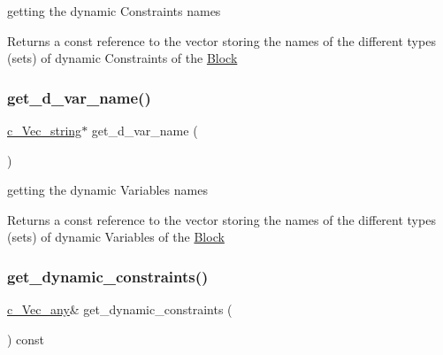 getting the dynamic Constraints\textquotesingle{} names 

Returns a const reference to the vector storing the names of the different types (sets) of dynamic Constraints of the \mbox{\hyperlink{class_s_m_spp__di__unipi__it_1_1_block}{Block}} \mbox{\label{class_s_m_spp__di__unipi__it_1_1_block_af2bfcc91820dd84530bc0677a0a498ee}} 
\subsubsection{\texorpdfstring{get\+\_\+d\+\_\+var\+\_\+name()}{get\_d\_var\_name()}}
{\footnotesize\ttfamily \mbox{\hyperlink{group___s_m_s__types_ga4eb8b5e087882b48fc77ba2a18267301}{c\+\_\+\+Vec\+\_\+string}}$\ast$ get\+\_\+d\+\_\+var\+\_\+name (\begin{DoxyParamCaption}\item[{void}]{ }\end{DoxyParamCaption})\hspace{0.3cm}{\ttfamily [inline]}}



getting the dynamic Variables\textquotesingle{} names 

Returns a const reference to the vector storing the names of the different types (sets) of dynamic Variables of the \mbox{\hyperlink{class_s_m_spp__di__unipi__it_1_1_block}{Block}} \mbox{\label{class_s_m_spp__di__unipi__it_1_1_block_a3f409f4fea9571956a95359dbeef7395}} 
\subsubsection{\texorpdfstring{get\+\_\+dynamic\+\_\+constraints()}{get\_dynamic\_constraints()}}
{\footnotesize\ttfamily \mbox{\hyperlink{group___s_m_s__types_gaa16aeddc7a50d64299ee0f8d9ca5dc7d}{c\+\_\+\+Vec\+\_\+any}}\& get\+\_\+dynamic\+\_\+constraints (\begin{DoxyParamCaption}\item[{void}]{ }\end{DoxyParamCaption}) const\hspace{0.3cm}{\ttfamily [inline]}}



